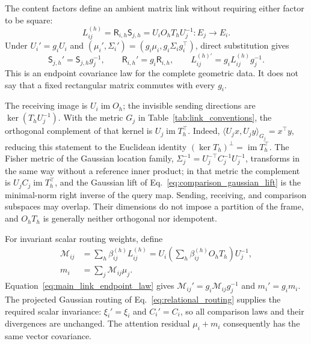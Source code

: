 \documentclass[twoside,11pt]{article}
\begin{document}
The content factors define an ambient matrix link without requiring either factor to be square:
\begin{equation}
L_{ij}^{(h)}=\mathsf R_{i,h}\mathsf S_{j,h}
=U_iO_hT_hU_j^{-1}:E_j\longrightarrow E_i.
\label{eq:main_content_link}
\end{equation}
Under $U_i'=g_iU_i$ and $(\mu_i',\Sigma_i')=(g_i\mu_i,g_i\Sigma_i g_i^\top)$, direct substitution gives
\begin{equation}
\mathsf S_{j,h}'=\mathsf S_{j,h}g_j^{-1},\qquad
\mathsf R_{i,h}'=g_i\mathsf R_{i,h},\qquad
L_{ij}^{(h)\prime}=g_iL_{ij}^{(h)}g_j^{-1}.
\label{eq:main_link_endpoint_law}
\end{equation}
This is an endpoint covariance law for the complete geometric data. It does not say that a fixed rectangular matrix commutes with every $g_i$.

The receiving image is $U_i\operatorname{im}O_h$; the invisible sending directions are $\ker(T_hU_j^{-1})$. With the metric $G_j$ in Table~\ref{tab:link_conventions}, the orthogonal complement of that kernel is $U_j\operatorname{im}T_h^\top$. Indeed, $\langle U_jx,U_jy\rangle_{G_j}=x^\top y$, reducing this statement to the Euclidean identity $(\ker T_h)^\perp=\operatorname{im}T_h^\top$. The Fisher metric of the Gaussian location family, $\Sigma_j^{-1}=U_j^{-\top}C_j^{-1}U_j^{-1}$, transforms in the same way without a reference inner product; in that metric the complement is $U_jC_j\operatorname{im}T_h^\top$, and the Gaussian lift of Eq.~\eqref{eq:comparison_gaussian_lift} is the minimal-norm right inverse of the query map. Sending, receiving, and comparison subspaces may overlap. Their dimensions do not impose a partition of the frame, and $O_hT_h$ is generally neither orthogonal nor idempotent.

For invariant scalar routing weights, define
\begin{align}
\mathcal M_{ij}&=\sum_h\beta_{ij}^{(h)}L_{ij}^{(h)}
=U_i\left(\sum_h\beta_{ij}^{(h)}O_hT_h\right)U_j^{-1},\\
m_i&=\sum_j\mathcal M_{ij}\mu_j.
\label{eq:main_routed_link}
\end{align}
Equation~\eqref{eq:main_link_endpoint_law} gives $\mathcal M_{ij}'=g_i\mathcal M_{ij}g_j^{-1}$ and $m_i'=g_im_i$. The projected Gaussian routing of Eq.~\eqref{eq:relational_routing} supplies the required scalar invariance: $\xi_i'=\xi_i$ and $C_i'=C_i$, so all comparison laws and their divergences are unchanged. The attention residual $\mu_i+m_i$ consequently has the same vector covariance.
\end{document}
